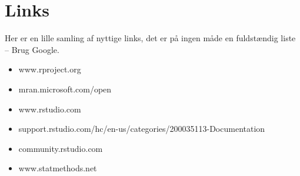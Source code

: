 \documentclass[
]{book}
\providecommand{\tightlist}{%
  \setlength{\itemsep}{0pt}\setlength{\parskip}{0pt}}
\begin{document}
\hypertarget{links}{%
\chapter{Links}\label{links}}

Her er en lille samling af nyttige links, det er på ingen måde en fuldstændig liste -- Brug Google.

\begin{itemize}
\tightlist
\item
  www.rproject.org
\item
  mran.microsoft.com/open
\item
  www.rstudio.com
\item
  support.rstudio.com/hc/en-us/categories/200035113-Documentation
\item
  community.rstudio.com
\item
  www.statmethods.net
\end{itemize}

  
\end{document}
